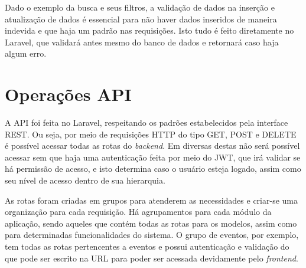 

Dado o exemplo da busca e seus filtros, a validação de dados na inserção e atualização de dados é essencial para não haver dados inseridos de maneira indevida e que haja um padrão nas requisições. Isto tudo é feito diretamente no Laravel, que validará antes mesmo do banco de dados e retornará caso haja algum erro.

\section{Operações API}
A API foi feita no Laravel, respeitando os padrões estabelecidos pela interface REST. Ou seja, por meio de requisições HTTP do tipo GET, POST e DELETE é possível acessar todas as rotas do \textit{backend}. Em diversas destas não será possível acessar sem que haja uma autenticação feita por meio do JWT, que irá validar se há permissão de acesso, e isto determina caso o usuário esteja logado, assim como seu nível de acesso dentro de sua hierarquia. 

As rotas foram criadas em grupos para atenderem as necessidades e criar-se uma organização para cada requisição. Há agrupamentos para cada módulo da aplicação, sendo aqueles que contém todas as rotas para os modelos, assim como para determinadas funcionalidades do sistema. O grupo de eventos, por exemplo, tem todas as rotas pertencentes a eventos e possui autenticação e validação do que pode ser escrito na URL para poder ser acessada devidamente pelo \textit{frontend}. 



